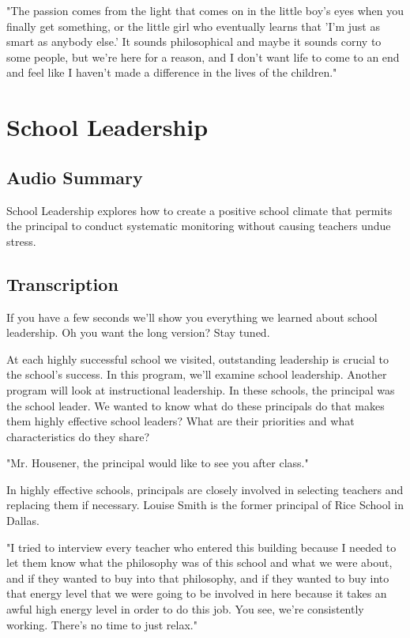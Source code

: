 "The passion comes from the light that comes on in the little boy's eyes when you finally get something, or the little girl who eventually learns that 'I'm just as smart as anybody else.' It sounds philosophical and maybe it sounds corny to some people, but we're here for a reason, and I don't want life to come to an end and feel like I haven't made a difference in the lives of the children."

\section{School Leadership}

\subsection{Audio Summary}

School Leadership explores how to create a positive school climate that permits the principal to conduct systematic monitoring without causing teachers undue stress.

\subsection{Transcription}

If you have a few seconds we'll show you everything we learned about school leadership. Oh you want the long version? Stay tuned.

At each highly successful school we visited, outstanding leadership is crucial to the school's success. In this program, we'll examine school leadership. Another program will look at instructional leadership. In these schools, the principal was the school leader. We wanted to know what do these principals do that makes them highly effective school leaders? What are their priorities and what characteristics do they share?

"Mr. Housener, the principal would like to see you after class."

In highly effective schools, principals are closely involved in selecting teachers and replacing them if necessary. Louise Smith is the former principal of Rice School in Dallas.

"I tried to interview every teacher who entered this building because I needed to let them know what the philosophy was of this school and what we were about, and if they wanted to buy into that philosophy, and if they wanted to buy into that energy level that we were going to be involved in here because it takes an awful high energy level in order to do this job. You see, we're consistently working. There's no time to just relax."

